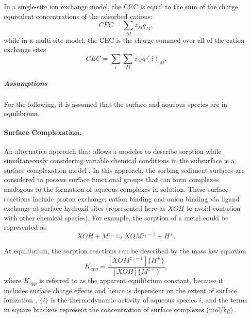 In a single-site ion exchange model, the CEC is equal to the sum of the charge equivalent concentrations of the adsorbed cations:
\begin{equation}
  CEC = \sum _{M}z_{M} q_{M},
\end{equation} 
while in a multi-site model, the CEC is the charge summed over all of the cation exchange sites \citep{cernik-1996, voegelin-2000}
\begin{equation}
  CEC = \sum _{i}\sum _{M}z_{M} q(i)_{M}   .
\end{equation} 

\subparagraph{Assumptions} 
For the following, it is assumed that the surface and aqueous species are in equilibrium.


\paragraph{Surface Complexation.} 
\label{sec:surfaceComplexation} An alternative approach that allows a modeler to describe sorption while
simultaneously considering variable chemical conditions in the subsurface is a surface complexation model \citep{davis-2004}.  
In this approach, the sorbing sediment surfaces are considered to possess
surface functional groups that can form complexes analogous to the
formation of aqueous complexes in solution.  
These surface reactions include proton exchange, cation binding and anion binding via ligand
exchange at surface hydroxil sites (represented here as $XOH$ to avoid
confusion with other chemical species). 
For example, the sorption of a metal could be represented as
%
\begin{equation} \label{eq:metalSorption} 
  XOH + M^{z_+} \leftrightharpoons XOM^{z_+ - 1} + H^{+}  .
\end{equation} 

At equilibrium, the sorption reactions can be described by the mass law equation
%
\begin{equation} \label{eq:sorptionMassAction}
  K_{app} =\frac{\left[XOM^{z_{+}-1 } \right]\{H^{+} \} }{\left[XOH\right] \{M^{z+} \} }  ,
\end{equation} 
where $K_{app}$ is referred to as the apparent equilibrium constant,
because it includes surface charge effects and hence is dependent on
the extent of surface ionization \citep{dzombak-1990}, $\{i\}$
is the thermodynamic activity of aqueous species $i$, and the terms in
square brackets represent the concentration of surface complexes (mol/kg).

